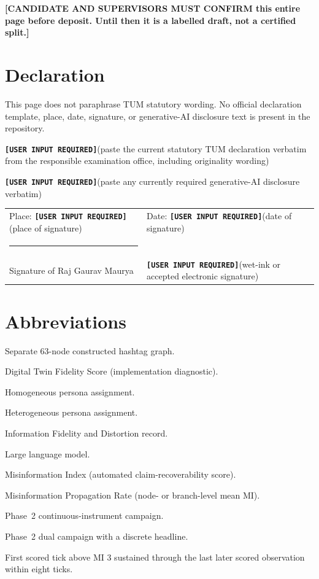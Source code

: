 \documentclass[
  11pt,a4paper,twoside,openright,
  bibliography=totoc,listof=totoc,
  captions=tableheading,headings=normal,numbers=noenddot
]{scrbook}
\newcommand{\UserInput}[1]{%
  \textbf{\texttt{[USER INPUT REQUIRED]}}\space(#1)}
\begin{document}
\noindent
\textbf{[CANDIDATE AND SUPERVISORS MUST CONFIRM this entire page before
deposit. Until then it is a labelled draft, not a certified split.]}

\chapter*{Declaration}
This page does not paraphrase TUM statutory wording.
No official declaration template, place, date, signature, or generative-AI
disclosure text is present in the repository.

\vspace{1.2em}
\UserInput{paste the current statutory TUM declaration verbatim from the
responsible examination office, including originality wording}

\vspace{1.2em}
\UserInput{paste any currently required generative-AI disclosure verbatim}

\vspace{1.2em}
\begin{tabular}{@{}p{}p{}@{}}
Place: \UserInput{place of signature} &
Date: \UserInput{date of signature} \\[2.2em]
\rule{0.42\textwidth}{0.4pt} & \\
Signature of Raj Gaurav Maurya &
\UserInput{wet-ink or accepted electronic signature} \\
\end{tabular}

\tableofcontents
\listoffigures
\listoftables

\chapter*{Abbreviations}
\begin{description}[style=multiline,leftmargin=3.7cm]
  \item[D-net] Separate 63-node constructed hashtag graph.
  \item[DTFS] Digital Twin Fidelity Score (implementation diagnostic).
  \item[H] Homogeneous persona assignment.
  \item[He] Heterogeneous persona assignment.
  \item[IFD] Information Fidelity and Distortion record.
  \item[LLM] Large language model.
  \item[MI] Misinformation Index (automated claim-recoverability score).
  \item[MPR] Misinformation Propagation Rate (node- or branch-level mean MI).
  \item[T2c] Phase~2 continuous-instrument campaign.
  \item[T2d] Phase~2 dual campaign with a discrete headline.
  \item[\texorpdfstring{\(k^{*}\)}{k*}] First scored tick above MI 3 sustained through the last later scored observation within eight ticks.
\end{description}
\end{document}

